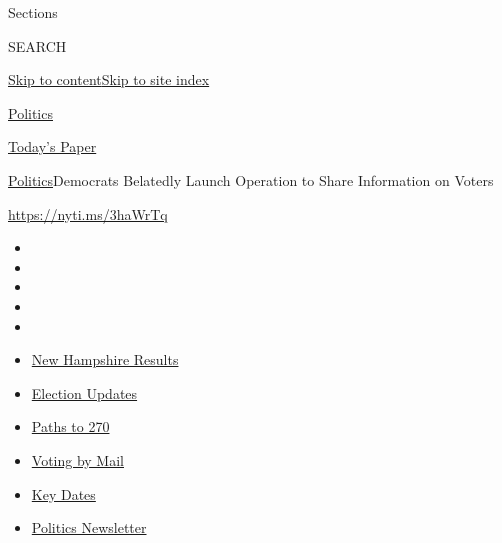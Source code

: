 Sections

SEARCH

\protect\hyperlink{site-content}{Skip to
content}\protect\hyperlink{site-index}{Skip to site index}

\href{https://www.nytimes3xbfgragh.onion/section/politics}{Politics}

\href{https://myaccount.nytimes3xbfgragh.onion/auth/login?response_type=cookie\&client_id=vi}{}

\href{https://www.nytimes3xbfgragh.onion/section/todayspaper}{Today's
Paper}

\href{/section/politics}{Politics}\textbar{}Democrats Belatedly Launch
Operation to Share Information on Voters

\url{https://nyti.ms/3haWrTq}

\begin{itemize}
\item
\item
\item
\item
\item
\end{itemize}

\begin{itemize}
\item
  \href{https://www.nytimes3xbfgragh.onion/interactive/2020/09/08/us/elections/results-new-hampshire-primary-elections.html?action=click\&pgtype=Article\&state=default\&region=TOP_BANNER\&context=storylines_menu}{New
  Hampshire Results}
\item
  \href{https://www.nytimes3xbfgragh.onion/live/2020/09/08/us/trump-vs-biden?action=click\&pgtype=Article\&state=default\&region=TOP_BANNER\&context=storylines_menu}{Election
  Updates}
\item
  \href{https://www.nytimes3xbfgragh.onion/interactive/2020/us/elections/election-states-biden-trump.html?action=click\&pgtype=Article\&state=default\&region=TOP_BANNER\&context=storylines_menu}{Paths
  to 270}
\item
  \href{https://www.nytimes3xbfgragh.onion/interactive/2020/08/31/us/politics/vote-by-mail-deadlines.html?action=click\&pgtype=Article\&state=default\&region=TOP_BANNER\&context=storylines_menu}{Voting
  by Mail}
\item
  \href{https://www.nytimes3xbfgragh.onion/interactive/2019/us/elections/2020-presidential-election-calendar.html?action=click\&pgtype=Article\&state=default\&region=TOP_BANNER\&context=storylines_menu}{Key
  Dates}
\item
  \href{https://www.nytimes3xbfgragh.onion/newsletters/politics?action=click\&pgtype=Article\&state=default\&region=TOP_BANNER\&context=storylines_menu}{Politics
  Newsletter}
\end{itemize}

